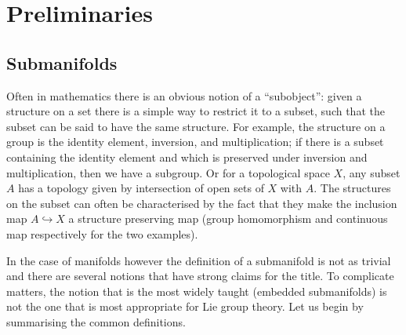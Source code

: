 
\section{Preliminaries}

\subsection{Submanifolds}

Often in mathematics there is an obvious notion of a ``subobject'': given a structure on a set there is a simple way to restrict it to a subset, such that the subset can be said to have the same structure.
For example, the structure on a group is the identity element, inversion, and multiplication; if there is a subset containing the identity element and which is preserved under inversion and multiplication, then we have a subgroup.
Or for a topological space $X$, any subset $A$ has a topology given by intersection of open sets of $X$ with $A$.
The structures on the subset can often be characterised by the fact that they make the inclusion map $A \hookrightarrow X$ a structure preserving map (group homomorphism and continuous map respectively for the two examples).

In the case of manifolds however the definition of a submanifold is not as trivial and there are several notions that have strong claims for the title.
To complicate matters, the notion that is the most widely taught (embedded submanifolds) is not the one that is most appropriate for Lie group theory.
Let us begin by summarising the common definitions.

